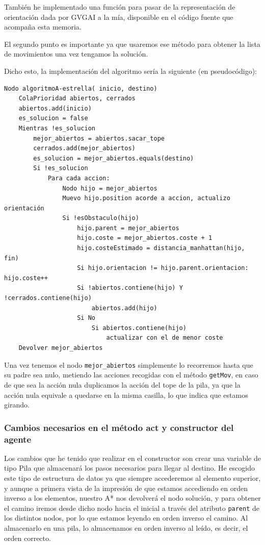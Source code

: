\documentclass[10pt, spanish]{article}
\begin{document}
También he implementado una función para pasar de la representación de orientación dada por GVGAI a la mía, disponible en el código fuente que acompaña esta memoria.

El segundo punto es importante ya que usaremos ese método para obtener la lista de movimientos una vez tengamos la solución.

Dicho esto, la implementación del algoritmo sería la siguiente (en pseudocódigo):

\begin{lstlisting}
Nodo algoritmoA-estrella( inicio, destino)
	ColaPrioridad abiertos, cerrados
	abiertos.add(inicio)
	es_solucion = false
	Mientras !es_solucion
		mejor_abiertos = abiertos.sacar_tope
		cerrados.add(mejor_abiertos)
		es_solucion = mejor_abiertos.equals(destino)
		Si !es_solucion
			Para cada accion:
				Nodo hijo = mejor_abiertos
				Muevo hijo.position acorde a accion, actualizo orientación
				Si !esObstaculo(hijo)
					hijo.parent = mejor_abiertos
					hijo.coste = mejor_abiertos.coste + 1
					hijo.costeEstimado = distancia_manhattan(hijo, fin)
					Si hijo.orientacion != hijo.parent.orientacion: hijo.coste++
					Si !abiertos.contiene(hijo) Y !cerrados.contiene(hijo)
						abiertos.add(hijo)
					Si No
						Si abiertos.contiene(hijo)
							actualizar con el de menor coste
	Devolver mejor_abiertos
\end{lstlisting}

Una vez tenemos el nodo \texttt{mejor\_abiertos} simplemente lo recorremos hasta que su padre sea nulo, metiendo las acciones recogidas con el método \texttt{getMov}, en caso de que sea la acción nula duplicamos la acción del tope de la pila, ya que la acción nula equivale a quedarse en la misma casilla, lo que indica que estamos girando.

\subsubsection{Cambios necesarios en el método act y constructor del agente}

Los cambios que he tenido que realizar en el constructor son crear una variable de tipo Pila que almacenará los pasos necesarios para llegar al destino. He escogido este tipo de estructura de datos ya que siempre accederemos al elemento superior, y aunque a primera vista de la impresión de que estamos accediendo en orden inverso a los elementos, nuestro A* nos devolverá el nodo solución, y para obtener el camino iremos desde dicho nodo hacia el inicial a través del atributo \texttt{parent} de los distintos nodos, por lo que estamos leyendo en orden inverso el camino. Al almacenarlo en una pila, lo almacenamos en orden inverso al leído, es decir, el orden correcto.
\end{document}
